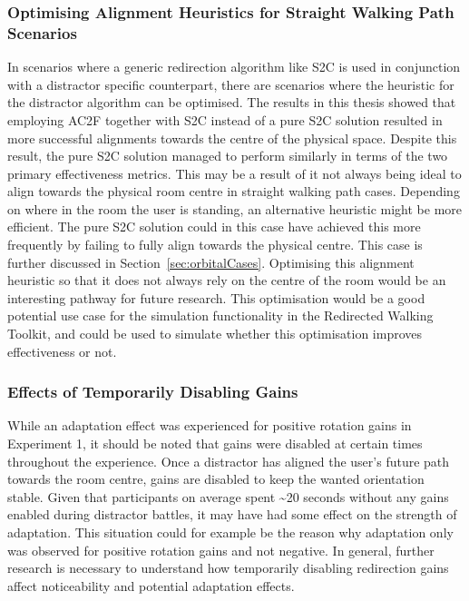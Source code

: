 \subsubsection{Optimising Alignment Heuristics for Straight Walking Path Scenarios}
In scenarios where a generic redirection algorithm like S2C is used in conjunction with a distractor specific counterpart, there are scenarios where the heuristic for the distractor algorithm can be optimised. The results in this thesis showed that employing AC2F together with S2C instead of a pure S2C solution resulted in more successful alignments towards the centre of the physical space. Despite this result, the pure S2C solution managed to perform similarly in terms of the two primary effectiveness metrics. This may be a result of it not always being ideal to align towards the physical room centre in straight walking path cases. Depending on where in the room the user is standing, an alternative heuristic might be more efficient. The pure S2C solution could in this case have achieved this more frequently by failing to fully align towards the physical centre. This case is further discussed in Section~\ref{sec:orbitalCases}. Optimising this alignment heuristic so that it does not always rely on the centre of the room would be an interesting pathway for future research. This optimisation would be a good potential use case for the simulation functionality in the Redirected Walking Toolkit, and could be used to simulate whether this optimisation improves effectiveness or not. 

\subsubsection{Effects of Temporarily Disabling Gains}
While an adaptation effect was experienced for positive rotation gains in Experiment 1, it should be noted that gains were disabled at certain times throughout the experience. Once a distractor has aligned the user's future path towards the room centre, gains are disabled to keep the wanted orientation stable. Given that participants on average spent \textasciitilde20 seconds without any gains enabled during distractor battles, it may have had some effect on the strength of adaptation. This situation could for example be the reason why adaptation only was observed for positive rotation gains and not negative. In general, further research is necessary to understand how temporarily disabling redirection gains affect noticeability and potential adaptation effects.


